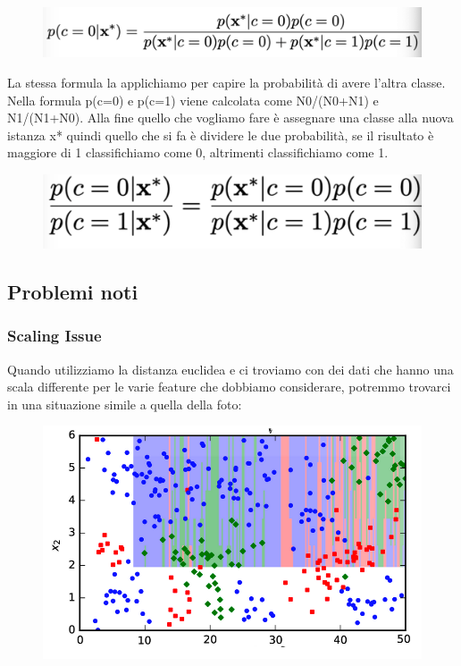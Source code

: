 \documentclass[14pt]{extreport}
\begin{document}
\begin{figure}[H] 
	\centering
	\includegraphics[width=0.7\linewidth]{470.jpeg}
	\end{figure}

	La stessa formula la applichiamo per capire la probabilità di avere l’altra classe.
	Nella formula p(c=0) e p(c=1) viene calcolata come N0/(N0+N1) e N1/(N1+N0).
	Alla fine quello che vogliamo fare è assegnare una classe alla nuova istanza x* quindi quello che si fa è dividere le due probabilità, se il risultato è maggiore di 1 classifichiamo come 0, altrimenti classifichiamo come 1.
	

\begin{figure}[H] 
	\centering
	\includegraphics[width=0.7\linewidth]{471.jpeg}
	\end{figure}


	\subsection{Problemi noti}

	\subsubsection{Scaling Issue}
	
	Quando utilizziamo la distanza euclidea e ci troviamo con dei dati che hanno una scala differente per le varie feature che dobbiamo considerare, potremmo trovarci in una situazione simile a quella della foto:

	\begin{figure}[H] 
		\centering
		\includegraphics[width=0.7\linewidth]{472.jpeg}
		\end{figure}
\end{document}
